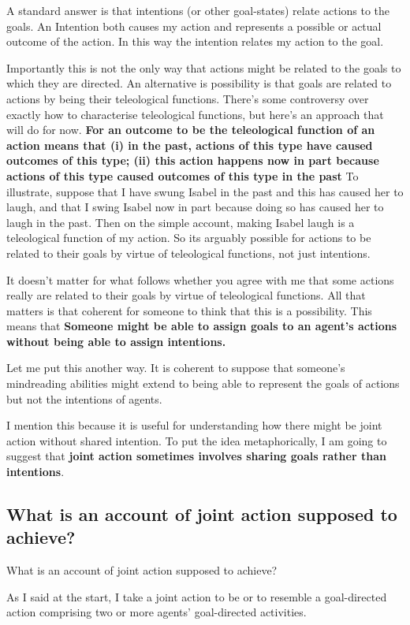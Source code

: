 \documentclass[12pt,a4paper]{extarticle}
\begin{document}
A standard answer is that intentions (or other goal-states) relate actions to the goals.
An Intention both causes my action and represents a possible or actual outcome of the action.
In this way the intention relates my action to the goal.

Importantly this is not the only way that actions might be related to the goals to which they are directed.
An alternative is possibility is that goals are related to actions by being their teleological functions.
There's some controversy over exactly how to characterise teleological functions, but here's an approach that will do for now.
\textbf{
For an outcome to be the teleological function of an action means that (i) in the past, actions of this type have caused outcomes of this type; (ii) this action happens now in part because actions of this type caused outcomes of this type in the past
}
To illustrate, suppose that I have swung Isabel in the past and this has caused her to laugh, and that I  swing Isabel now in part because doing so has caused her to laugh in the past.
Then on the simple account, making Isabel laugh is a teleological function of my action.
So its arguably possible for actions to be related to their goals by virtue of teleological functions, not just intentions.

It doesn't matter for what follows whether you agree with me that some actions really are related to their goals by virtue of teleological functions.  
All that matters is that coherent for someone to think that this is a possibility.
This means that \textbf{Someone might be able to assign goals to an agent's actions without being able to assign intentions.}

Let me put this another way.
It is coherent to suppose that someone's mindreading abilities might extend to being able to represent the goals of actions but not the intentions of agents.

I mention this because it is useful for understanding how there might be joint action without shared intention.
To put the idea metaphorically, I am going to suggest that \textbf{joint action sometimes involves sharing goals rather than intentions}.


\subsection{What is an account of joint action supposed to achieve?}
What is an account of joint action supposed to achieve?

As I said at the start, I take a joint action to be or to resemble a goal-directed action comprising two or more agents' goal-directed activities.
\end{document}
